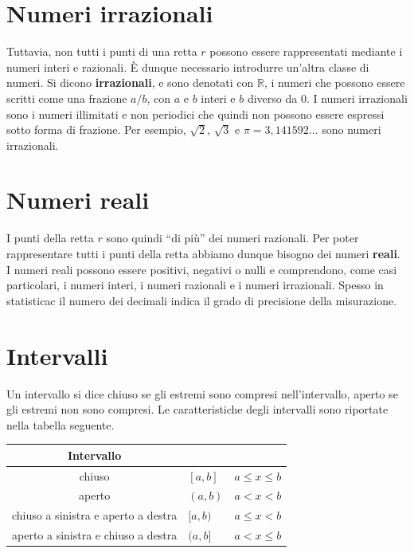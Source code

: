 \documentclass[
]{memoir}
\theoremstyle{definition}
\theoremstyle{definition}
\theoremstyle{definition}
\theoremstyle{definition}
\theoremstyle{remark}
\begin{document}
\hypertarget{numeri-irrazionali}{%
\section{Numeri irrazionali}\label{numeri-irrazionali}}

Tuttavia, non tutti i punti di una retta \(r\) possono essere
rappresentati mediante i numeri interi e razionali. È dunque necessario
introdurre un'altra classe di numeri. Si dicono \textbf{irrazionali}, e sono
denotati con \(\mathbb{R}\), i numeri che possono essere scritti come una
frazione \(a / b\), con \(a\) e \(b\) interi e \(b\) diverso da 0. I numeri
irrazionali sono i numeri illimitati e non periodici che quindi non
possono essere espressi sotto forma di frazione. Per esempio,
\(\sqrt{2}\), \(\sqrt{3}\) e \({\displaystyle \pi =3,141592\ldots}\) sono
numeri irrazionali.

\hypertarget{numeri-reali}{%
\section{Numeri reali}\label{numeri-reali}}

I punti della retta \(r\) sono quindi ``di più'' dei numeri razionali. Per
poter rappresentare tutti i punti della retta abbiamo dunque bisogno dei
numeri \textbf{reali}. I numeri reali possono essere positivi, negativi o nulli
e comprendono, come casi particolari, i numeri interi, i numeri
razionali e i numeri irrazionali. Spesso in statisticac il numero dei
decimali indica il grado di precisione della misurazione.

\hypertarget{intervalli}{%
\section{Intervalli}\label{intervalli}}

Un intervallo si dice chiuso se gli estremi sono compresi
nell'intervallo, aperto se gli estremi non sono compresi. Le
caratteristiche degli intervalli sono riportate nella tabella seguente.

\begin{longtable}[]{@{}cll@{}}
\toprule
Intervallo & & \\
\midrule
\endhead
chiuso & \([a, b]\) & \(a \leq x \leq b\) \\
aperto & \((a, b)\) & \(a < x < b\) \\
chiuso a sinistra e aperto a destra & \([a, b)\) & \(a \leq x < b\) \\
aperto a sinistra e chiuso a destra & \((a, b]\) & \(a < x \leq b\) \\
\bottomrule
\end{longtable}
\end{document}
